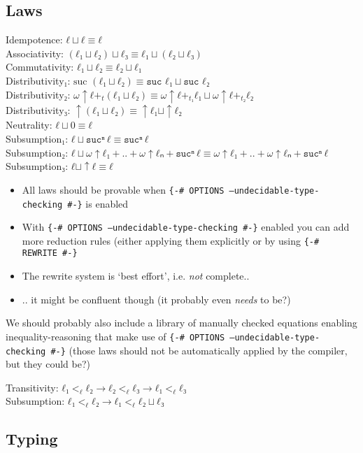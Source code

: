 \documentclass[runningheads,fleqn]{llncs}
\begin{document}
\subsection{Laws}
Idempotence: $ℓ ⊔ ℓ ≡ ℓ$ \\ 
Associativity: $(ℓ₁ ⊔ ℓ₂) ⊔ ℓ₃ ≡ ℓ₁ ⊔ (ℓ₂ ⊔ ℓ₃)$ \\
Commutativity: $ℓ₁ ⊔ ℓ₂ ≡ ℓ₂ ⊔ ℓ₁$ \\
Distributivity$₁$: $\text{suc } (ℓ₁ ⊔ ℓ₂) ≡ \texttt{suc } ℓ₁ ⊔ \texttt{suc } ℓ₂$ \\
Distributivity$₂$: $ω ↑ ℓ +_{t} (ℓ₁ ⊔ ℓ₂) ≡ ω ↑ ℓ +_{t₁} ℓ₁ ⊔ ω ↑ ℓ +_{t₂} ℓ₂$ \\
Distributivity$₃$: $↑ (ℓ₁ ⊔ ℓ₂) ≡ ↑ ℓ₁ ⊔ ↑ ℓ₂$ \\
Neutrality: $ℓ ⊔ 0 ≡ ℓ$ \\
Subsumption$₁$: $ℓ ⊔ \texttt{suc}ⁿ \ ℓ ≡ \texttt{suc}ⁿ \ ℓ$\\
Subsumption$₂$: $ℓ ⊔ ω ↑ ℓ₁ + .. + ω ↑ ℓₙ + \texttt{suc}ⁿ \ ℓ ≡ ω ↑ ℓ₁ + .. + ω ↑ ℓₙ + \texttt{suc}ⁿ \ ℓ$\\
Subsumption$₃$: $ℓ ⊔ ↑ ℓ ≡ ℓ$ 

\begin{itemize}
  \item All laws should be provable when \texttt{\{-\# OPTIONS --undecidable-type-checking \#-\}} is enabled
  \item With  \texttt{\{-\# OPTIONS --undecidable-type-checking \#-\}} enabled you can add more reduction rules (either applying them explicitly or by using \texttt{\{-\# REWRITE \#-\}} 
  \item The rewrite system is `best effort', i.e. \emph{not} complete..
  \item .. it might be confluent though (it probably even \emph{needs} to be?)
\end{itemize}

We should probably also include a library of manually checked equations enabling inequality-reasoning that make use of \texttt{\{-\# OPTIONS --undecidable-type-checking \#-\}} (those laws should not be automatically applied by the compiler, but they could be?)

\noindent Transitivity: $ℓ₁ <_ℓ ℓ₂ → ℓ₂ <_ℓ ℓ₃ → ℓ₁ <_ℓ ℓ₃$ \\ 
Subsumption: $ℓ₁ <_ℓ ℓ₂ → ℓ₁ <_ℓ ℓ₂ ⊔ ℓ₃$

\subsection{Typing}
\end{document}
